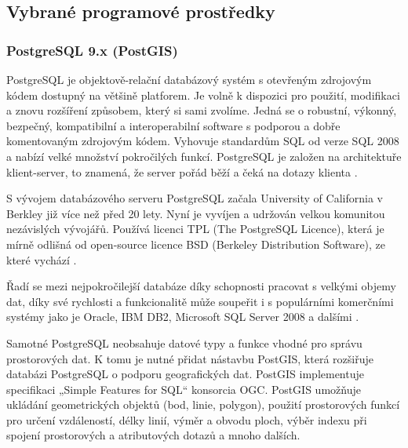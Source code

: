 \subsection{Vybrané programové prostředky}
\label{kPouziteProstredky}

\subsubsection{PostgreSQL 9.x (PostGIS)}
        \label{PostgreSQL}
        PostgreSQL je objektově-relační databázový systém s otevřeným zdrojovým
        kódem dostupný na většině platforem. Je volně k dispozici pro použití,
        modifikaci a znovu rozšíření způsobem, který si sami zvolíme. Jedná se
        o robustní, výkonný, bezpečný, kompatibilní a interoperabilní software
        s podporou a dobře komentovaným zdrojovým kódem. Vyhovuje standardům
        SQL od verze SQL 2008 a nabízí velké množství pokročilých funkcí.
        PostgreSQL je založen na architektuře klient-server, to znamená, že
        server pořád běží a čeká na dotazy klienta \citep{Momjian2001}. 

        S vývojem databázového serveru PostgreSQL začala University of
        California v Berkley již více než před 20 lety. Nyní je vyvíjen a
        udržován velkou komunitou nezávislých vývojářů. Používá licenci TPL
        (The PostgreSQL Licence), která je mírně odlišná od open-source licence
        BSD (Berkeley Distribution Software), ze které vychází
        \citep{RiggsKrossing2010}.

        Řadí se mezi nejpokročilejší databáze díky schopnosti pracovat s
        velkými objemy dat, díky své rychlosti a funkcionalitě může soupeřit i
        s populárními komerčními systémy jako je Oracle, IBM DB2, Microsoft SQL
        Server 2008 a dalšími \citep{PostgreSQL2012}.

        Samotné PostgreSQL neobsahuje datové typy a funkce vhodné pro správu
        prostorových dat. K tomu je nutné přidat nástavbu PostGIS, která
        rozšiřuje databázi PostgreSQL o podporu geografických dat. PostGIS
        implementuje specifikaci „Simple Features for SQL“ konsorcia OGC.
        PostGIS umožňuje ukládání geometrických objektů (bod, linie, polygon),
        použití prostorových funkcí pro určení vzdáleností, délky linií, výměr
        a obvodu ploch, výběr indexu při spojení prostorových a atributových
        dotazů a mnoho dalších.

